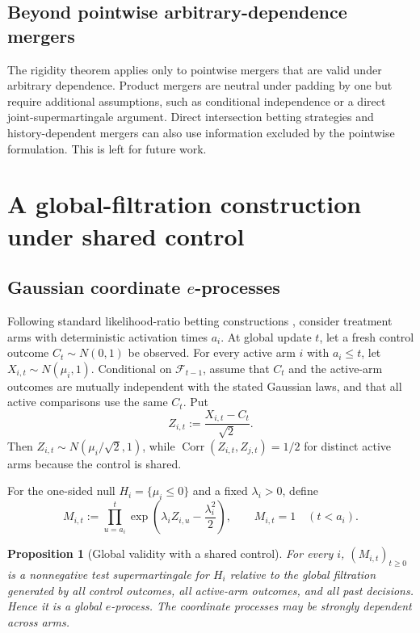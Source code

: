 \documentclass[11pt]{article}
\numberwithin{equation}{section}
\theoremstyle{plain}
\newtheorem{proposition}[theorem]{Proposition}
\theoremstyle{definition}
\newcommand{\F}{\mathcal F}
\begin{document}
\subsection{Beyond pointwise arbitrary-dependence mergers}\label{sec:other-mergers}

The rigidity theorem applies only to pointwise mergers that are valid under arbitrary dependence. Product mergers are neutral under padding by one but require additional assumptions, such as conditional independence or a direct joint-supermartingale argument. Direct intersection betting strategies and history-dependent mergers can also use information excluded by the pointwise formulation. This is left for future work.

\section{A global-filtration construction under shared control}\label{sec:construction}

\subsection{Gaussian coordinate \texorpdfstring{$e$}{e}-processes}\label{sec:shared-control}

Following standard likelihood-ratio betting constructions \citep{ShaferEtAl2011TestMartingales,RamdasWangBook}, consider treatment arms with deterministic activation times $a_i$. At global update $t$, let a fresh control outcome $C_t\sim N(0,1)$ be observed. For every active arm $i$ with $a_i\leq t$, let $X_{i,t}\sim N(\mu_i,1)$. Conditional on $\F_{t-1}$, assume that $C_t$ and the active-arm outcomes are mutually independent with the stated Gaussian laws, and that all active comparisons use the same $C_t$. Put
\begin{equation}\label{eq:shared-z}
  Z_{i,t}:=\frac{X_{i,t}-C_t}{\sqrt2}.
\end{equation}
Then $Z_{i,t}\sim N(\mu_i/\sqrt2,1)$, while $\operatorname{Corr}(Z_{i,t},Z_{j,t})=1/2$ for distinct active arms because the control is shared.

For the one-sided null $H_i=\{\mu_i\leq0\}$ and a fixed $\lambda_i>0$, define
\begin{equation}\label{eq:shared-eprocess}
  M_{i,t}:=
  \prod_{u=a_i}^{t}
  \exp\left(\lambda_i Z_{i,u}-\frac{\lambda_i^2}{2}\right),
  \qquad M_{i,t}=1\quad(t<a_i).
\end{equation}

\begin{proposition}[Global validity with a shared control]\label{prop:shared-control}
For every $i$, $(M_{i,t})_{t\geq0}$ is a nonnegative test supermartingale for $H_i$ relative to the global filtration generated by all control outcomes, all active-arm outcomes, and all past decisions. Hence it is a global $e$-process. The coordinate processes may be strongly dependent across arms.
\end{proposition}
\end{document}
